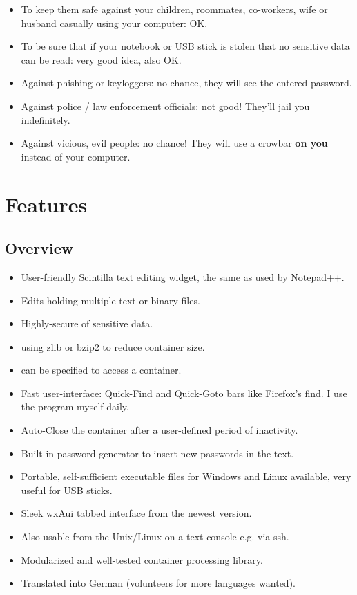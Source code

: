 \documentclass[a4paper,12pt,twoside,draft]{article}
\begin{document}
\begin{itemize}
  \item To keep them safe against your children, roommates, co-workers, wife or husband casually using your computer: OK.
  \item To be sure that if your notebook or USB stick is stolen that no sensitive data can be read: very good idea, also OK.
  \item Against phishing or keyloggers: no chance, they will see the entered password.
  \item Against police / law enforcement officials: not good! They'll jail you indefinitely.
  \item Against vicious, evil people: no chance! They will use a crowbar \textbf{on you} instead of your computer.
\end{itemize}

\section{Features}\label{Features}

\subsection{Overview}\label{Overview}

\begin{itemize}
  \item User-friendly Scintilla text editing widget, the same as used by Notepad++.
  \item Edits  holding multiple text or binary files.
  \item Highly-secure  of sensitive data.
  \item {} using zlib or bzip2 to reduce container size.
  \item {} can be specified to access a container.
  \item Fast user-interface: Quick-Find and Quick-Goto bars like Firefox's find. I use the program myself daily.
  \item Auto-Close the container after a user-defined period of inactivity.
  \item Built-in password generator to insert new passwords in the text.
  \item Portable, self-sufficient executable files for Windows and Linux available, very useful for USB sticks.
  \item Sleek wxAui tabbed interface from the newest  version.
  \item Also usable from the Unix/Linux  on a text console e.g. via ssh.
  \item Modularized and well-tested container processing library.
  \item Translated into German (volunteers for more languages wanted).
\end{itemize}
\end{document}
